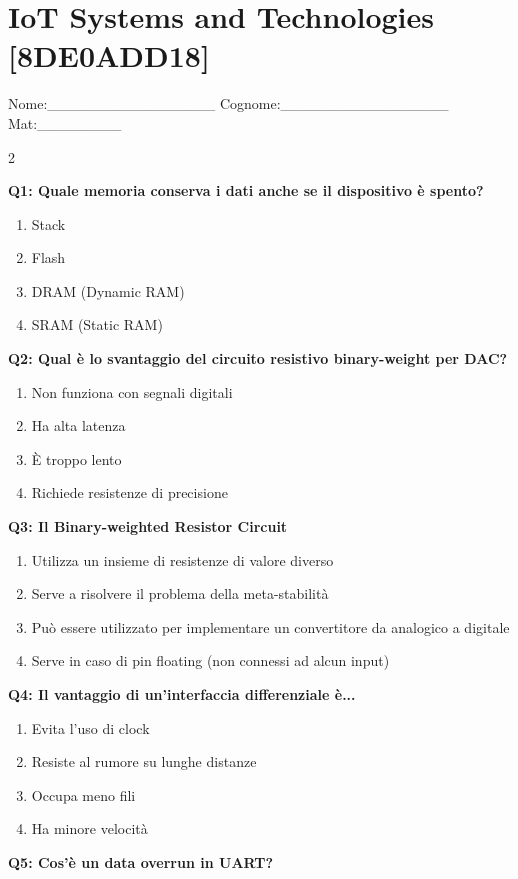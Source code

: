 \documentclass[10pt]{article}
\begin{document}
\section*{IoT Systems and Technologies \footnotesize [8DE0ADD18]}
{\footnotesize Nome:\_\_\_\_\_\_\_\_\_\_\_\_\_\_\_\_ Cognome:\_\_\_\_\_\_\_\_\_\_\_\_\_\_\_\_ Mat:\_\_\_\_\_\_\_\_}
\begin{multicols}{2}

\textbf{Q1: Quale memoria conserva i dati anche se il dispositivo è spento?}

\begin{enumerate}[label=\arabic*.]
\item Stack
\item Flash
\item DRAM (Dynamic RAM)
\item SRAM (Static RAM)
\end{enumerate}
\textbf{Q2: Qual è lo svantaggio del circuito resistivo binary-weight per DAC?}

\begin{enumerate}[label=\arabic*.]
\item Non funziona con segnali digitali
\item Ha alta latenza
\item È troppo lento
\item Richiede resistenze di precisione
\end{enumerate}
\textbf{Q3: Il Binary-weighted Resistor Circuit}

\begin{enumerate}[label=\arabic*.]
\item Utilizza un insieme di resistenze di valore diverso
\item Serve a risolvere il problema della meta-stabilità
\item Può essere utilizzato per implementare un convertitore da analogico a digitale
\item Serve in caso di pin floating (non connessi ad alcun input)
\end{enumerate}
\textbf{Q4: Il vantaggio di un'interfaccia differenziale è...}

\begin{enumerate}[label=\arabic*.]
\item Evita l’uso di clock
\item Resiste al rumore su lunghe distanze
\item Occupa meno fili
\item Ha minore velocità
\end{enumerate}
\textbf{Q5: Cos'è un data overrun in UART?}


\end{multicols}
\end{document}
